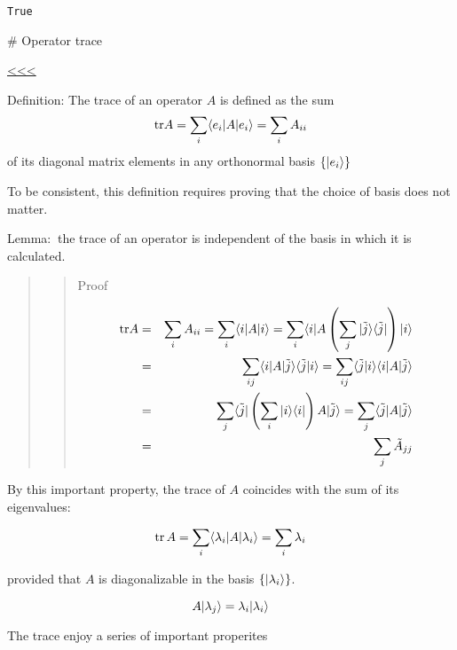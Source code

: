 \documentclass[11pt]{article}
\makeatletter
\newcommand{\boxspacing}{\kern\kvtcb@left@rule\kern\kvtcb@boxsep}
\newcommand{\prompt}[4]{
        {\ttfamily\llap{{\color{#2}[#3]:\hspace{3pt}#4}}\vspace{-\baselineskip}}
    }
\makeatother
\begin{document}
            \begin{tcolorbox}[breakable, size=fbox, boxrule=.5pt, pad at break*=1mm, opacityfill=0]
\prompt{Out}{outcolor}{11}{\boxspacing}
\begin{Verbatim}[commandchars=\\\{\}]
True
\end{Verbatim}
\end{tcolorbox}
        
    \# Operator trace

\hyperref[top]{<<<}

    Definition: The trace of an operator \(A\) is defined as the sum \\
\[
{\rm tr} A = \sum_i \langle e_i| A |e_i\rangle = \sum_i A_{ii}
\] of its diagonal matrix elements in any orthonormal basis
\(\{|e_i\rangle\}\)

    To be consistent, this definition requires proving that the choice of
basis does not matter.

    Lemma:\(~\) the trace of an operator is independent of the basis in
which it is calculated.

\begin{quote}
\begin{quote}
Proof

\begin{eqnarray}
{\rm tr} A  &=&\sum_i A_{ii} =\sum_{i} \langle i|A|i\rangle =\sum_{i} \langle i|A\left( \sum_j| \tilde j\rangle \langle \tilde j|\right)|i\rangle
\nonumber\\
&=& \sum_{ij}\langle i|A|\tilde j\rangle \langle \tilde j|i\rangle = \sum_{ij}\langle \tilde j|i\rangle\langle i|A|\tilde j\rangle  \nonumber\\
&=& \sum_{j} \langle \tilde j|\left(\sum_i| i\rangle \langle i|\right) A |\tilde j\rangle= \sum_{j} \langle \tilde j|A|\tilde j\rangle\nonumber\\
&=& \sum_j \tilde A_{jj}
\end{eqnarray}
\end{quote}
\end{quote}

    By this important property, the trace of \(A\) coincides with the sum of
its eigenvalues:

\[
\mathrm{tr} \, A = \sum_i \langle \lambda_i| A |\lambda_i\rangle = \sum_i \lambda_i
\]

provided that \(A\) is diagonalizable in the basis
\(\{|\lambda_i\rangle\}\).

\[
A|\lambda_j\rangle = \lambda_i |\lambda_i\rangle
\]

    The trace enjoy a series of important properites
\end{document}
